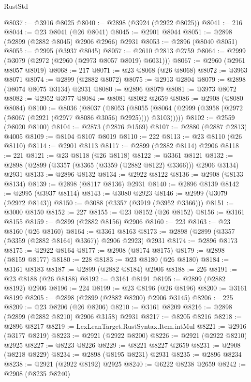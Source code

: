 \begin{lexlean}{RustStd}
\begin{coremodule}
@8037 := @3916 @8025
@8040 := @2898 (@3924 (@2922 @8025))
@8041 := 216
@8044 := @23 @8041 (@26 @8041)
@8045 := @2901 @8044
@8051 := @2898 (@2899 (@2882 @8045) @2906 @2966) @2931
@8053 := @2896 (@8040 @8051)
@8055 := @2995 (@3937 @8045)
@8057 := @2610 @2813 @2759
@8064 := @2999 (@3079 (@2972 (@2960 (@2973 @8057 @8019) @6031)))
@8067 := @2960 (@2961 @8057 @8019)
@8068 := 217
@8071 := @23 @8068 (@26 @8068)
@8072 := @3963 @8071
@8074 := @2899 (@2882 @8072)
@8075 := @2913 @2804
@8079 := @2898 (@8074 @8075 @3134) @2931
@8080 := @2896 @8079
@8081 := @3973 @8072
@8082 := @2952 @3977
@8084 := @8081 @8082 @2659
@8086 := @2908 (@8080 @8084)
@8100 := @8036
    (@8037
      (@8053
        (@8055 (@8064 (@2999 (@3958 (@2972 (@8067 (@2921 (@2977 @8086 @3056) @2925)))) @3103)))))
@8102 := @2559 (@8020 @8100)
@8104 := @2873 (@2876 @1569)
@8107 := @2880 (@2887 @2813) @4005
@8109 := @8104 @8107 @8019
@8110 := 222
@8113 := @23 @8110 (@26 @8110)
@8114 := @2901 @8113
@8117 := @2899 (@2882 @8114) @2906
@8118 := 221
@8121 := @23 @8118 (@26 @8118)
@8122 := @3361 @8121
@8132 := @2898 (@2899 (@3357 (@3365 (@3359 (@2882 @8122) @3366))) @2906 @3134) @2931
@8133 := @2896 @8132
@8134 := @2922 @8122
@8136 := @2908 (@8133 @8134)
@8139 := @2898 (@8117 @8136) @2931
@8140 := @2896 @8139
@8142 := @2995 (@3937 @8114)
@8143 := @3080 @2923
@8146 := @2999 (@3079 (@2972 @8143))
@8150 := @3088 (@3357 (@3919 (@3952 @3366)))
@8151 := @3000 @8150
@8152 := 227
@8155 := @23 @8152 (@26 @8152)
@8156 := @3161 @8155
@8159 := @2899 (@2882 @8156) @2906
@8160 := 223
@8163 := @23 @8160 (@26 @8160)
@8164 := @3361 @8163
@8173 := @2898 (@2899 (@3357 (@3359 (@2882 @8164) @3367)) @2906 @2923) @2931
@8174 := @2896 @8173
@8175 := @2922 @8164
@8177 := @2908 (@8174 @8175)
@8179 := @2898 (@8159 @8177)
@8180 := 228
@8183 := @23 @8180 (@26 @8180)
@8184 := @3161 @8183
@8187 := @2899 (@2882 @8184) @2906
@8188 := 226
@8191 := @23 @8188 (@26 @8188)
@8192 := @3161 @8191
@8195 := @2899 (@2882 @8192) @2906
@8196 := 224
@8199 := @23 @8196 (@26 @8196)
@8200 := @3161 @8199
@8205 := @2898 (@2899 (@2882 @8200) @2906 @3145)
@8206 := 225
@8209 := @23 @8206 (@26 @8206)
@8210 := @3161 @8209
@8216 := @2898 (@2899 (@2882 @8210) @2906 @3158) @2931
@8217 := @8205 @8216
@8218 := @2896 @8217
@8219 := LexLeanTarget.RustSyntax.Item.intMul
@8221 := @2916 (@3177 @8219)
@8223 := @2921 (@2922 @8200)
@8226 := @2921 (@2922 @8210) @2925
@8227 := @8223 @8226
@8229 := @8221 @8227 @2659
@8231 := @2908 (@8218 @8229)
@8234 := @2898 (@8195 @8231) @2931
@8235 := @2896 @8234
@8238 := @2921 (@2922 @8192) @2925
@8240 := @6222 @8238 @2659
@8242 := @2908 (@8235 @8240)

\end{coremodule}
\end{lexlean}
